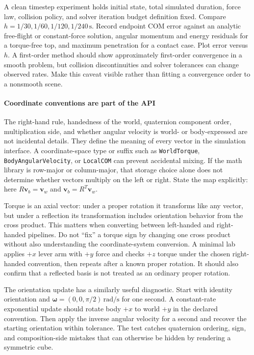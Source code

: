 A clean timestep experiment holds initial state, total simulated duration, force law, collision policy, and solver iteration budget definition fixed. Compare \(h=1/30,1/60,1/120,1/240\,\mathrm s\). Record endpoint COM error against an analytic free-flight or constant-force solution, angular momentum and energy residuals for a torque-free top, and maximum penetration for a contact case. Plot error versus \(h\). A first-order method should show approximately first-order convergence in a smooth problem, but collision discontinuities and solver tolerances can change observed rates. Make this caveat visible rather than fitting a convergence order to a nonsmooth scene.

\paragraph{Coordinate conventions are part of the API}\label{coordinate-conventions-are-part-of-the-api}

The right-hand rule, handedness of the world, quaternion component order, multiplication side, and whether angular velocity is world- or body-expressed are not incidental details. They define the meaning of every vector in the simulation interface. A coordinate-space type or suffix such as \texttt{WorldTorque}, \texttt{BodyAngularVelocity}, or \texttt{LocalCOM} can prevent accidental mixing. If the math library is row-major or column-major, that storage choice alone does not determine whether vectors multiply on the left or right. State the map explicitly: here \(R\mathbf v_b=\mathbf v_w\) and \(\mathbf v_b=R^T\mathbf v_w\).

Torque is an axial vector: under a proper rotation it transforms like any vector, but under a reflection its transformation includes orientation behavior from the cross product. This matters when converting between left-handed and right-handed pipelines. Do not ``fix'' a torque sign by changing one cross product without also understanding the coordinate-system conversion. A minimal lab applies \(+x\) lever arm with \(+y\) force and checks \(+z\) torque under the chosen right-handed convention, then repeats after a known proper rotation. It should also confirm that a reflected basis is not treated as an ordinary proper rotation.

The orientation update has a similarly useful diagnostic. Start with identity orientation and \(\boldsymbol\omega=(0,0,\pi/2)\,\mathrm{rad/s}\) for one second. A constant-rate exponential update should rotate body \(+x\) to world \(+y\) in the declared convention. Then apply the inverse angular velocity for a second and recover the starting orientation within tolerance. The test catches quaternion ordering, sign, and composition-side mistakes that can otherwise be hidden by rendering a symmetric cube.

